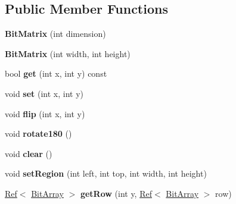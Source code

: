\subsection*{Public Member Functions}
\begin{DoxyCompactItemize}
\item 
\mbox{\label{classzxing_1_1_bit_matrix_a5c8c677cafd9e739b137e5e9988c2ec9}} 
{\bfseries Bit\+Matrix} (int dimension)
\item 
\mbox{\label{classzxing_1_1_bit_matrix_aa77e6aff2b0d54e0dbd5a78c9e6324cf}} 
{\bfseries Bit\+Matrix} (int width, int height)
\item 
\mbox{\label{classzxing_1_1_bit_matrix_a9cbe2a391af0a6d6c6447015377e9f6f}} 
bool {\bfseries get} (int x, int y) const
\item 
\mbox{\label{classzxing_1_1_bit_matrix_abd7a69267bfe1fa88e11fe3f7c7a3c43}} 
void {\bfseries set} (int x, int y)
\item 
\mbox{\label{classzxing_1_1_bit_matrix_a625e768ed217d135b2bce7f1927f3693}} 
void {\bfseries flip} (int x, int y)
\item 
\mbox{\label{classzxing_1_1_bit_matrix_ad8db806653a515f05ea60a6c1eb36cab}} 
void {\bfseries rotate180} ()
\item 
\mbox{\label{classzxing_1_1_bit_matrix_a792fb451b52f7e8abae0b77fc61ddb6f}} 
void {\bfseries clear} ()
\item 
\mbox{\label{classzxing_1_1_bit_matrix_aced41a0a67ae664da7c61b0d56253158}} 
void {\bfseries set\+Region} (int left, int top, int width, int height)
\item 
\mbox{\label{classzxing_1_1_bit_matrix_ac1df56977e2f243f7cac423e92ba7a26}} 
\mbox{\hyperlink{classzxing_1_1_ref}{Ref}}$<$ \mbox{\hyperlink{classzxing_1_1_bit_array}{Bit\+Array}} $>$ {\bfseries get\+Row} (int y, \mbox{\hyperlink{classzxing_1_1_ref}{Ref}}$<$ \mbox{\hyperlink{classzxing_1_1_bit_array}{Bit\+Array}} $>$ row)

\end{DoxyCompactItemize}

